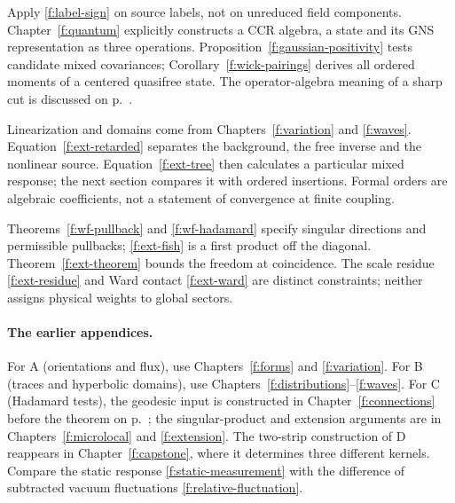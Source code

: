 \begin{description}[style=nextline,leftmargin=0pt,labelindent=0pt,labelwidth=0pt,labelsep=0pt,font=\normalfont\bfseries]
\item[11. The linear commutator.] Apply \eqref{f:label-sign} on source labels, not on unreduced field components. Chapter~\ref{f:quantum} explicitly constructs a CCR algebra, a state and its GNS representation as three operations. Proposition~\ref{f:gaussian-positivity} tests candidate mixed covariances; Corollary~\ref{f:wick-pairings} derives all ordered moments of a centered quasifree state. The operator-algebra meaning of a sharp cut is discussed on p.~\pageref{f:local-factors}.
\item[12. Perturbations about a sewn solution.] Linearization and domains come from Chapters~\ref{f:variation} and \ref{f:waves}. Equation~\eqref{f:ext-retarded} separates the background, the free inverse and the nonlinear source. Equation~\eqref{f:ext-tree} then calculates a particular mixed response; the next section compares it with ordered insertions. Formal orders are algebraic coefficients, not a statement of convergence at finite coupling.
\item[13. Time-ordered products.] Theorems~\ref{f:wf-pullback} and \ref{f:wf-hadamard} specify singular directions and permissible pullbacks; \eqref{f:ext-fish} is a first product off the diagonal. Theorem~\ref{f:ext-theorem} bounds the freedom at coincidence. The scale residue \eqref{f:ext-residue} and Ward contact \eqref{f:ext-ward} are distinct constraints; neither assigns physical weights to global sectors.
\end{description}

\paragraph{The earlier appendices.} For A (orientations and flux), use Chapters~\ref{f:forms} and \ref{f:variation}. For B (traces and hyperbolic domains), use Chapters~\ref{f:distributions}--\ref{f:waves}. For C (Hadamard tests), the geodesic input is constructed in Chapter~\ref{f:connections} before the theorem on p.~\pageref{f:wf-hadamard}; the singular-product and extension arguments are in Chapters~\ref{f:microlocal} and \ref{f:extension}. The two-strip construction of D reappears in Chapter~\ref{f:capstone}, where it determines three different kernels. Compare the static response \eqref{f:static-measurement} with the difference of subtracted vacuum fluctuations \eqref{f:relative-fluctuation}.

